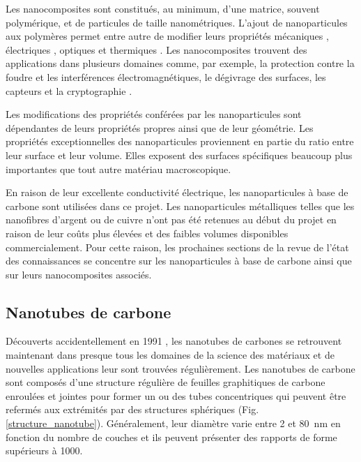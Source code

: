 Les nanocomposites sont constitués, au minimum, d'une matrice, souvent polymérique, et de particules de taille nanométriques. 
L'ajout de nanoparticules aux polymères permet entre autre de modifier leurs propriétés mécaniques \cite{Thostenson2002a}, électriques \cite{Zheng2003a}, optiques \cite{Hu2014} et thermiques \cite{Diez-Pascual2009, Al-Saleh2009c}. 
Les nanocomposites trouvent des applications dans plusieurs domaines comme, par exemple, la protection contre la foudre et les interférences électromagnétiques, le dégivrage des surfaces, les capteurs et la cryptographie \cite{Andrews2001, Thostenson2001c, Mittal2014h, Gaztelumendi2017, Chu2014, Hu2016, Al-Saleh2009, Chopra2003}. 

Les modifications des propriétés conférées par les nanoparticules sont dépendantes de leurs propriétés propres ainsi que de leur géométrie. 
Les propriétés exceptionnelles des nanoparticules proviennent en partie du ratio entre leur surface et leur volume. 
Elles exposent des surfaces spécifiques beaucoup plus importantes que tout autre matériau macroscopique. 

En raison de leur excellente conductivité électrique, les nanoparticules à base de carbone sont utilisées dans ce projet. 
Les nanoparticules métalliques telles que les nanofibres d'argent ou de cuivre n'ont pas été retenues au début du projet en raison de leur coûts plus élevées et des faibles volumes disponibles commercialement. 
Pour cette raison, les prochaines sections de la revue de l'état des connaissances se concentre sur les nanoparticules à base de carbone ainsi que sur leurs nanocomposites associés. 

\subsection{Nanotubes de carbone}

Découverts accidentellement en 1991 \cite{iijima1991}, les nanotubes de carbones se retrouvent maintenant dans presque tous les domaines de la science des matériaux et de nouvelles applications leur sont trouvées régulièrement. 
Les nanotubes de carbone sont composés d'une structure régulière de feuilles graphitiques de carbone enroulées et jointes pour former un ou des tubes concentriques qui peuvent être refermés aux extrémités par des structures sphériques (Fig. \ref{structure_nanotube}). 
Généralement, leur diamètre varie entre 2 et \SI{80}{\nano\metre} en fonction du nombre de couches et ils peuvent présenter des rapports de forme supérieurs à 1000. 

